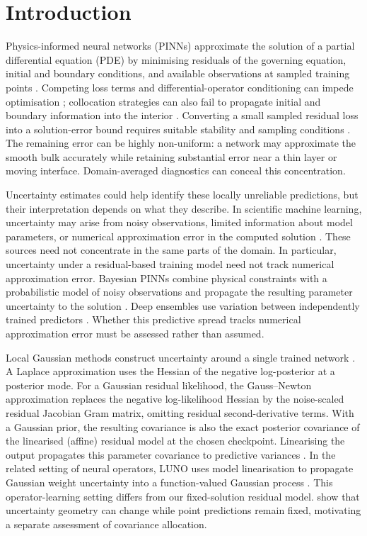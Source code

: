 \section{Introduction}\label{sec:intro}

Physics-informed neural networks (PINNs) approximate the solution of a partial
differential equation (PDE) by minimising residuals of the governing equation,
initial and boundary conditions, and available observations at sampled training
points \citep{raissi2019pinns}. Competing loss terms and differential-operator
conditioning can impede optimisation
\citep{wang2021understanding,rathore2024challenges}; collocation strategies can
also fail to propagate initial and boundary information into the interior
\citep{daw2023r3}. Converting a small sampled residual loss into a solution-error
bound requires suitable stability and sampling conditions
\citep{mishra2023generalization}. The remaining
error can be highly non-uniform: a network may approximate the smooth bulk
accurately while retaining substantial error near a thin layer or moving
interface. Domain-averaged diagnostics can conceal this concentration.

Uncertainty estimates could help identify these locally unreliable predictions,
but their interpretation depends on what they describe. In scientific machine
learning, uncertainty may arise from noisy observations, limited information about
model parameters, or numerical approximation error in the computed solution
\citep{psaros2023uq}. These sources need not concentrate in the same parts of
the domain. In particular, uncertainty under a residual-based training model
need not track numerical approximation error.
Bayesian PINNs combine physical constraints with a probabilistic model of noisy
observations and propagate the resulting parameter uncertainty to the solution
\citep{yang2021bpinns}. Deep ensembles use variation between independently trained
predictors \citep{lakshminarayanan2017ensembles}. Whether this predictive spread
tracks numerical approximation error must be assessed rather than assumed.

Local Gaussian methods construct uncertainty around a single trained network
\citep{daxberger2021laplace}. A Laplace approximation uses the Hessian of the
negative log-posterior at a posterior mode. For a Gaussian residual likelihood,
the Gauss--Newton approximation replaces the negative log-likelihood Hessian by
the noise-scaled residual Jacobian Gram matrix, omitting residual second-derivative
terms. With a Gaussian
prior, the resulting covariance is also the exact posterior covariance of the
linearised (affine) residual model at the chosen checkpoint. Linearising the output
propagates this parameter covariance to predictive variances
\citep{immer2021linearized}. In the related setting of neural operators, LUNO
uses model linearisation to propagate Gaussian weight uncertainty into a
function-valued Gaussian process \citep{magnani2025linearization}. This
operator-learning setting differs from our fixed-solution residual model.
\citet{kristiadi2021learnable} show that uncertainty geometry can change while
point predictions remain fixed, motivating a separate assessment of covariance
allocation.

